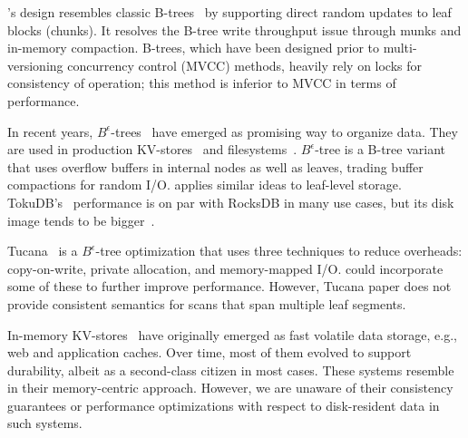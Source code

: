\sys's design resembles classic B-trees~\cite{Knuth:1998:ACP:280635} by supporting direct random updates to leaf blocks (chunks). 
It resolves the B-tree write throughput issue through munks and in-memory compaction. B-trees, which have been designed
prior to multi-versioning concurrency control (MVCC) methods, heavily rely on locks for consistency of operation; this method is 
inferior to MVCC in terms of performance.


In  recent years, $B^{\epsilon}$-trees~\cite{Brodal:2003:LBE:644108.644201} have emerged 
as promising way to organize data. They are used in production KV-stores~\cite{TokuDB} and filesystems~\cite{BetrFS}. 
$B^{\epsilon}$-tree is a B-tree variant that uses overflow buffers in internal nodes as well as leaves, trading buffer 
compactions for random I/O. \sys\/ applies similar ideas to leaf-level storage. TokuDB's~\cite{TokuDB} performance 
is on par with RocksDB in many use cases, but its disk image tends to be bigger~\cite{tokudb-vs-rocksdb}.

Tucana~\cite{tucana} is a $B^{\epsilon}$-tree optimization that uses three techniques to reduce overheads: copy-on-write, 
private allocation, and memory-mapped I/O. \sys\/ could incorporate some of these to further improve performance. 
However, Tucana paper does not provide consistent semantics for scans that span multiple leaf segments.

In-memory KV-stores~\cite{ignite, redis, memcached, Srinivasan:2016:AAR:3007263.3007276} have originally emerged as fast volatile 
data storage, e.g., web and application caches. Over time, most of them evolved to support durability,
albeit as a second-class citizen in most cases. 
These systems resemble \sys\/ in their memory-centric approach. 
However, we are unaware of their consistency guarantees or performance optimizations with respect  to disk-resident data in such systems. 

